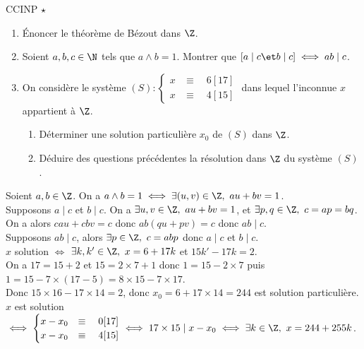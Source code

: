 \documentclass[11pt]{article}
\begin{document}
\begin{exercice}{CCINP $\star$}{}
    \begin{enumerate}
        \item Énoncer le théorème de Bézout dans $\Z$.
        \item Soient $a,b,c\in \N$ tels que $a\land b = 1$. Montrer que $[a \mid c \et b \mid c] \iff ab \mid c$.
        \item On considère le système $(S):\begin{cases} x &\equiv \quad 6[17] \\ x &\equiv \quad 4[15]\end{cases}$ dans lequel l'inconnue $x$ appartient à $\Z$.
        \begin{enumerate}
            \item Déterminer une solution particulière $x_0$ de $(S)$ dans $\Z$.
            \item Déduire des questions précédentes la résolution dans $\Z$ du système $(S)$.
        \end{enumerate}
    \end{enumerate}
    \tcblower
     Soient $a,b\in \Z$. On a $a\land b = 1 \iff \exists (u,v)\in\Z, ~ au+bv=1$.\\
     Supposons $a\mid c$ et $b\mid c$. On a $\exists u,v \in \Z, ~ au+bv=1$, et $\exists p,q \in \Z, ~ c=ap=bq$.\\
    On a alors $cau+cbv=c$ donc $ab(qu+pv)=c$ donc $ab\mid c$.\\
     Supposons $ab\mid c$, alors $\exists p \in \Z, ~ c = abp$ donc $a\mid c$ et $b\mid c$.\\
     $x$ solution $\iff$ $\exists k,k' \in \Z, ~ x = 6 + 17k$ et $15k'-17k=2$.\\
    On a $17=15+2$ et $15=2\times7+1$ donc $1=15-2\times7$ puis $1=15-7\times (17 - 5)=8\times15-7\times17$.\\
    Donc $15\times16 - 17\times 14 = 2$, donc $x_0=6+17\times14=244$ est solution particulière.\\
     $x$ est solution $\iff \begin{cases}x-x_0 &\equiv \quad 0[17]\\ x-x_0 &\equiv \quad 4[15]\end{cases} \iff 17\times15 \mid x-x_0\iff \exists k \in \Z, ~ x = 244 + 255k$.
\end{exercice}

\vspace*{-0.4cm}
\end{document}
